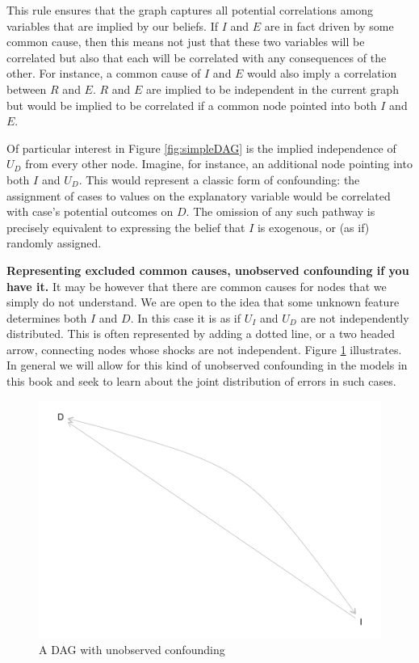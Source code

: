 \documentclass[12pt,]{book}
\begin{document}
This rule ensures that the graph captures all potential correlations among variables that are implied by our beliefs. If \(I\) and \(E\) are in fact driven by some common cause, then this means not just that these two variables will be correlated but also that each will be correlated with any consequences of the other. For instance, a common cause of \(I\) and \(E\) would also imply a correlation between \(R\) and \(E\). \(R\) and \(E\) are implied to be independent in the current graph but would be implied to be correlated if a common node pointed into both \(I\) and \(E\).

Of particular interest in Figure \ref{fig:simpleDAG} is the implied independence of \(U_D\) from every other node. Imagine, for instance, an additional node pointing into both \(I\) and \(U_D\). This would represent a classic form of confounding: the assignment of cases to values on the explanatory variable would be correlated with case's potential outcomes on \(D\). The omission of any such pathway is precisely equivalent to expressing the belief that \(I\) is exogenous, or (as if) randomly assigned.

\textbf{Representing excluded common causes, unobserved confounding if you have it.} It may be however that there are common causes for nodes that we simply do not understand. We are open to the idea that some unknown feature determines both \(I\) and \(D\). In this case it is as if \(U_I\) and \(U_D\) are not independently distributed. This is often represented by adding a dotted line, or a two headed arrow, connecting nodes whose shocks are not independent. Figure \ref{fig:simpleDAGb} illustrates. In general we will allow for this kind of unobserved confounding in the models in this book and seek to learn about the joint distribution of errors in such cases.

\begin{figure}
\centering
\includegraphics{ii_files/figure-latex/simpleDAGb-1.pdf}
\caption{\label{fig:simpleDAGb}A DAG with unobserved confounding}
\end{figure}
\end{document}
